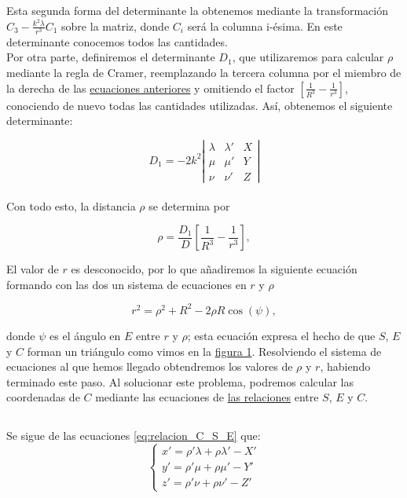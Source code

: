 \documentclass[11pt]{article}
\begin{document}
Esta segunda forma del determinante la obtenemos mediante la transformación $C_3-\frac{k^2\lambda}{r^3}C_1$ sobre la matriz, donde $C_i$ será la columna i-ésima. En este determinante conocemos todos las cantidades.\\

Por otra parte, definiremos el determinante $D_1$, que utilizaremos para calcular $\rho$ mediante la regla de Cramer, reemplazando la tercera columna por el miembro de la derecha de las \hyperref[eq:fin_paso_1]{ecuaciones anteriores} y omitiendo el factor $[\frac{1}{R^3}-\frac{1}{r^3}]$, conociendo de nuevo todas las cantidades utilizadas. Así, obtenemos el siguiente determinante:

\[
D_1 = -2k^2
\left|
\begin{array}{ccc}
\lambda & \lambda' & X\\
\mu & \mu' & Y\\
\nu & \nu' & Z
\end{array}
\right|
\]\\

Con todo esto, la distancia $\rho$ se determina por

\[
\rho = \frac{D_1}{D}[\frac{1}{R^3}-\frac{1}{r^3}],
\]

El valor de $r$ es desconocido, por lo que añadiremos la siguiente ecuación formando con las dos un sistema de ecuaciones en $r$ y $\rho$

\[
r^2=\rho^2+R^2-2\rho R\cos(\psi),
\]

\noindent donde $\psi$ es el ángulo en $E$ entre $r$ y $\rho$; esta ecuación expresa el hecho de que $S$, $E$ y $C$ forman un triángulo como vimos en la \hyperref[figure:1]{figura 1}. Resolviendo el sistema de ecuaciones al que hemos llegado obtendremos los valores de $\rho$ y $r$, habiendo terminado este paso. Al solucionar este problema, podremos calcular las coordenadas de $C$ mediante las ecuaciones de \hyperref[eq:relacion_C_S_E]{las relaciones} entre $S$, $E$ y $C$.\\

\subsection{}
Se sigue de las ecuaciones \ref{eq:relacion_C_S_E} que:
\[
\left\{
\begin{array}{l}
	x'=\rho'\lambda+\rho\lambda'-X'\\
	y'=\rho'\mu+\rho\mu'-Y'\\
	z'=\rho'\nu+\rho\nu'-Z'
\end{array}
\right.	
\]
\end{document}
